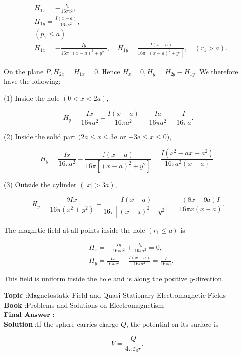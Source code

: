 \documentclass[10pt]{article}
\begin{document}
$$
\begin{aligned}
& H_{1 x}=-\frac{I y}{16 \pi a^{2}}, \\
& H_{1 y}=\frac{I(x-a)}{16 \pi a^{2}} \text {, } \\
& \left(p_{1} \leq a\right) \\
& H_{1 x}=-\frac{I y}{16 \pi\left[(x-a)^{2}+y^{2}\right]}, \quad H_{1 y}=\frac{I(x-a)}{16 \pi\left[(x-a)^{2}+y^{2}\right]}, \quad\left(r_{1}>a\right) .
\end{aligned}
$$

On the plane $P, H_{2 x}=H_{1 x}=0$. Hence $H_{x}=0, H_{y}=H_{2 y}-H_{1 y}$. We therefore have the following:

(1) Inside the hole $(0<x<2 a)$,

$$
H_{y}=\frac{I x}{16 \pi a^{2}}-\frac{I(x-a)}{16 \pi a^{2}}=\frac{I a}{16 \pi a^{2}}=\frac{I}{16 \pi a} .
$$

(2) Inside the solid part $(2 a \leq x \leq 3 a$ or $-3 a \leq x \leq 0)$,

$$
H_{y}=\frac{I x}{16 \pi a^{2}}-\frac{I(x-a)}{16 \pi\left[(x-a)^{2}+y^{2}\right]}=\frac{I\left(x^{2}-a x-a^{2}\right)}{16 \pi a^{2}(x-a)} .
$$

(3) Outside the cylinder $(|x|>3 a)$,

$$
H_{y}=\frac{9 I x}{16 \pi\left(x^{2}+y^{2}\right)}-\frac{I(x-a)}{16 \pi\left[(x-a)^{2}+y^{2}\right]}=\frac{(8 x-9 a) I}{16 \pi x(x-a)} .
$$

 The magnetic field at all points inside the hole $\left(r_{1} \leq a\right)$ is

$$
\begin{aligned}
&H_{x}=-\frac{I y}{16 \pi a^{2}}+\frac{I y}{16 \pi a^{2}}=0, \\
&H_{y}=\frac{I x}{16 \pi a^{2}}-\frac{I(x-a)}{16 \pi a^{2}}=\frac{I}{16 \pi a} .
\end{aligned}
$$

This field is uniform inside the hole and is along the positive $y$-direction.

\textbf{Topic} :Magnetostatic Field and Quasi-Stationary Electromagnetic Fields\\
\textbf{Book} :Problems and Solutions on Electromagnetism\\
\textbf{Final Answer} :\\


\textbf{Solution} :If the sphere carries charge $Q$, the potential on its surface is

$$
V=\frac{Q}{4 \pi \varepsilon_{0} r},
$$
\end{document}
